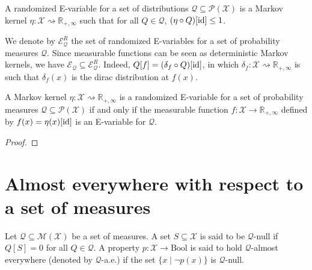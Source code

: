 \begin{definition}\label{def:randEVar}
  \leanok
A randomized E-variable for a set of distributions $\mathcal{Q} \subseteq \mathcal{P}(\mathcal{X})$ is a Markov kernel $\eta : \mathcal{X} \rightsquigarrow \mathbb{R}_{+,\infty}$ such that for all $Q \in \mathcal{Q}$, $(\eta \circ Q)[\operatorname{id}] \le 1$.
\end{definition}

We denote by $\mathcal{E}^R_{\mathcal{Q}}$ the set of randomized E-variables for a set of probability measures $\mathcal{Q}$.
Since measurable functions can be seen as deterministic Markov kernels, we have $\mathcal{E}_{\mathcal{Q}} \subseteq \mathcal{E}^R_{\mathcal{Q}}$.
Indeed, $Q[f] = (\delta_f \circ Q)[\operatorname{id}]$, in which $\delta_f : \mathcal{X} \rightsquigarrow \mathbb{R}_{+,\infty}$ is such that $\delta_f(x)$ is the dirac distribution at $f(x)$.


\begin{lemma}\label{lem:randEVar_iff_eVar}
  \leanok
A Markov kernel $\eta : \mathcal{X} \rightsquigarrow \mathbb{R}_{+,\infty}$ is a randomized E-variable for a set of probability measures $\mathcal{Q} \subseteq \mathcal{P}(\mathcal{X})$ if and only if the measurable function $f : \mathcal{X} \to \mathbb{R}_{+,\infty}$ defined by $f(x) = \eta(x)[\operatorname{id}]$ is an E-variable for $\mathcal{Q}$.
\end{lemma}

\begin{proof}\leanok

\end{proof}




\section{Almost everywhere with respect to a set of measures}

\begin{definition}\label{def:aeSet}
  \leanok
Let $\mathcal{Q} \subseteq \mathcal{M}(\mathcal{X})$ be a set of measures.
A set $S \subseteq \mathcal{X}$ is said to be $\mathcal{Q}$-null if $Q[S] = 0$ for all $Q \in \mathcal{Q}$.
A property $p : \mathcal{X} \to \mathrm{Bool}$ is said to hold $\mathcal{Q}$-almost everywhere (denoted by $\mathcal{Q}$-a.e.) if the set $\{x \mid \neg p(x)\}$ is $\mathcal{Q}$-null.
\end{definition}

